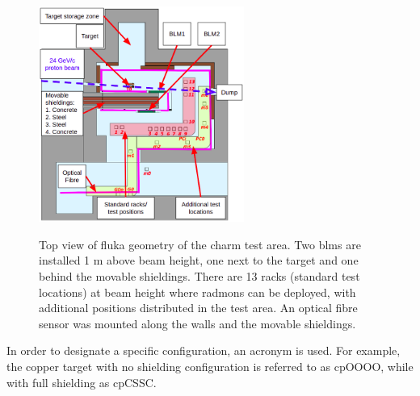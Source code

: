 \documentclass[encoding=utf8,british]{tumphthesis}
\begin{document}
\begin{figure}[H]
    \centering
    \subfloat
    {\includegraphics[width=0.6\textwidth]{figures/charm-geometry.png}}
    \caption{Top view of \acrshort{fluka} geometry of the \acrshort{charm} test area. Two \acrshort{blm}s are installed 1 m above beam height, one next to the target and one behind the movable shieldings. There are 13 racks (standard test locations) at beam height where \acrshort{radmon}s can be deployed, with additional positions distributed in the test area. An optical fibre sensor was mounted along the walls and the movable shieldings.}
    \label{fig:FLUKA-geometry}
    \vspace{-0.5cm}
\end{figure}



In order to designate a specific configuration, an acronym is used. For example, the copper target with no shielding configuration is referred to as cpOOOO, while with full shielding as cpCSSC.
\end{document}
